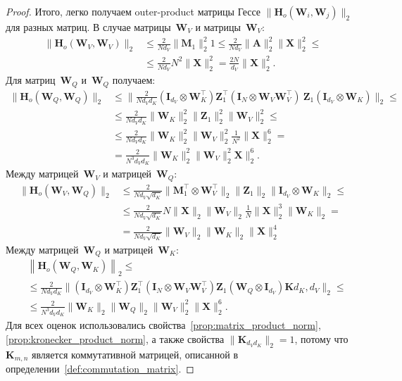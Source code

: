 \begin{proof}
Итого, легко получаем outer-product матрицы Гессе $\|\mathbf{H}_o (\mathbf{W}_i, \mathbf{W}_j) \|_2$  для разных матриц.
В случае матрицы~$\mathbf{W}_V$ и матрицы~$\mathbf{W}_V$:
\begin{align}
    \| \mathbf{H}_o(\mathbf{W}_V, \mathbf{W}_V)\|_2 &\leq \frac{2}{N d_V} \| \mathbf{M}_1\|^2_2 1 \leq \frac{2}{N d_V}\| \mathbf{A}\|^2_2 \| \mathbf{X}\|^2_2 \leq\\
    & \leq \frac{2}{N d_V} N^2 \| \mathbf{X}\|^2_2 = \frac{2N}{d_V}\| \mathbf{X}\|^2_2.
\end{align}
Для матриц~$\mathbf{W}_Q$ и~$\mathbf{W}_Q$ получаем:
\begin{align}
    \| \mathbf{H}_o(\mathbf{W}_Q, \mathbf{W}_Q)\|_2 &\leq \| \frac{2}{N d_V d_K} (\mathbf{I}_{d_V} \otimes \mathbf{W}^\top_K) \mathbf{Z}^\top_1 (\mathbf{I}_{N} \otimes \mathbf{W}_V\mathbf{W}^\top_V)\ \mathbf{Z}_1 (\mathbf{I}_{d_V} \otimes \mathbf{W}_K)\|_2 \leq\\
    &\leq \frac{2}{N d_V d_K} \| \mathbf{W}_K\|_2^2 \|\mathbf{Z}_1 \|^2_2 \| \mathbf{W}_V\|^2_2 \leq\\
    &\leq \frac{2}{N d_V d_K}\| \mathbf{W}_K\|_2^2\| \mathbf{W}_V\|^2_2 \frac{1}{N^2} \| \mathbf{X}\|^6_2 =\\
    &= \frac{2}{N^3 d_V d_K} \| \mathbf{W}_K\|_2^2\| \mathbf{W}_V\|^2_2 \mathbf{X}\|^6_2.
\end{align}
Между матрицей~$\mathbf{W}_V$ и матрицей~$\mathbf{W}_Q$:
\begin{align}
    \| \mathbf{H}_o(\mathbf{W}_V, \mathbf{W}_Q)\|_2 &\leq \frac{2}{N d_V \sqrt{d_K}} \|\mathbf{M}_1^\top \otimes \mathbf{W}_V^\top \|_2 \| \mathbf{Z}_1\|_2 \| \mathbf{I}_{d_V} \otimes \mathbf{W}_K \|_2 \leq\\
    &\leq \frac{2}{N d_V \sqrt{d_K}} N \| \mathbf{X}\|_2 \| \mathbf{W}_V\|_2 \frac{1}{N} \| \mathbf{X}\|^3_2 \| \mathbf{W}_K \|_2 =\\
    &= \frac{2}{N d_V \sqrt{d_K}} \| \mathbf{W}_V\|_2 \| \mathbf{W}_K \|_2 \| \mathbf{X}\|^4_2
\end{align}
Между матрицей~$\mathbf{W}_Q$ и матрицей~$\mathbf{W}_K$:
\begin{align}
    &\left\|\mathbf{H}_o(\mathbf{W}_Q, \mathbf{W}_K)\right\|_2 \leq \\
    &\leq \frac{2}{N d_V d_K} \big\|(\mathbf{I}_{d_V} \otimes \mathbf{W}^\top_K) \mathbf{Z}_1^\top(\mathbf{I}_{N} \otimes \mathbf{W}_V \mathbf{W}^\top_V)\mathbf{Z}_1 (\mathbf{W}_Q \otimes \mathbf{I}_{d_V}) \mathbf{K}{d_K, d_V}\big\|_2 \leq \\
    &\leq \frac{2}{N^3 d_V d_K} \big\|\mathbf{W}_K\|_2 \|\mathbf{W}_Q\|_2 \| \mathbf{W}_V\|_2^2 \|\mathbf{X} \big\|^6_2.
\end{align}
Для всех оценок использовались свойства~\ref{prop:matrix_product_norm}, \ref{prop:kronecker_product_norm}, а также свойства $\|\mathbf{K}_{d_V d_K} \|_2=1$, потому что $\mathbf{K}_{m,n}$ является коммутативной матрицей, описанной в определении~\ref{def:commutation_matrix}. 


\end{proof}
